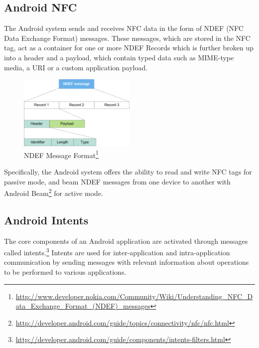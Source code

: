 \documentclass[12pt]{article}
\begin{document}
\subsection{Android NFC}

The Android system sends and receives NFC data in the form of NDEF (NFC Data Exchange Format) messages. These messages, which are stored in the NFC tag, act as a container for one or more NDEF Records which is further broken up into a header and a payload, which contain typed data such as MIME-type media, a URI or a custom application payload.

\begin{figure}[h!]
\begin{minipage}{\textwidth}
	\centering
		\includegraphics[width=0.5\textwidth]{NDEF_Format.png}
	\caption[Caption for LOF]%
		{NDEF Message Format\footnote{\url{http://www.developer.nokia.com/Community/Wiki/Understanding_NFC_Data_Exchange_Format_(NDEF)_messages}}}

\end{minipage} 
\end{figure}

Specifically, the Android system offers the ability to read and write NFC tags for passive mode, and beam NDEF messages from one device to another with Android Beam\footnote{\url{http://developer.android.com/guide/topics/connectivity/nfc/nfc.html}} for active mode. 

\subsection{Android Intents}
The core components of an Android application are activated through messages called intents.\footnote{\url{http://developer.android.com/guide/components/intents-filters.html}} Intents are used for inter-application and intra-application communication by sending messages with relevant information about operations to be performed to various applications.  
\end{document}
